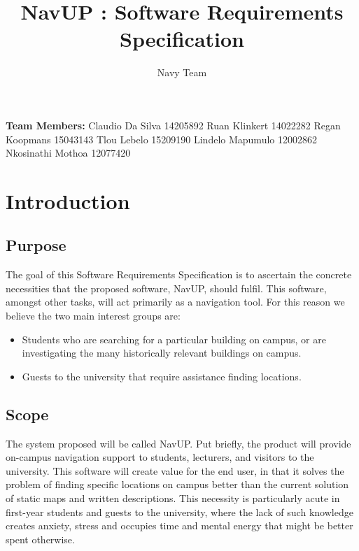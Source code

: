 \documentclass[12pt,a4paper]{article}
\author{Navy Team}
\title{NavUP : Software Requirements Specification}
\begin{document}
	\maketitle
	\bigskip
	\begin{flushright}
	 \textbf{Team Members: }\newline
	 Claudio Da Silva 14205892\newline
	 Ruan Klinkert 14022282\newline
	 Regan Koopmans 15043143\newline
	 Tlou Lebelo 15209190\newline
	 Lindelo Mapumulo 12002862\newline
	 Nkosinathi Mothoa 12077420\newline
    \end{flushright}

	\pagebreak
	\tableofcontents 
	\pagebreak


	\section{Introduction}

		\subsection{Purpose}

		The goal of this Software Requirements Specification is to ascertain the
		concrete necessities that the proposed software, NavUP, should fulfil. This
		software, amongst other tasks, will act primarily as a navigation tool. For
		this reason we believe the two main interest groups are:

		\begin{itemize}
			\item Students who are searching for a particular building on campus, or are
						investigating the many historically relevant buildings on campus.

			\item Guests to the university that require assistance finding locations.
		\end{itemize}


		\subsection{Scope}

			The system proposed will be called NavUP. Put briefly, the product will
			provide on-campus navigation support to students, lecturers, and visitors to
			the university. This software will create value for the end user, in that
			it solves the problem of finding specific locations on campus better than
			the current solution of static maps and written descriptions. This
			necessity is particularly acute in first-year students and guests to the
			university, where the lack of such knowledge creates anxiety, stress and
			occupies time and mental energy that might be better spent otherwise.
\end{document}
